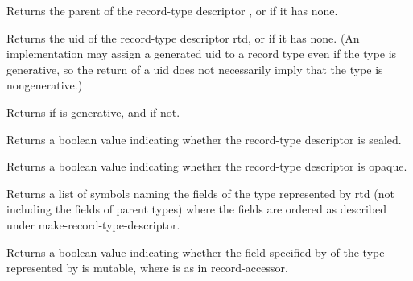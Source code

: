 \begin{entry}{%
}
   
Returns the parent of the record-type descriptor , or
\schfalse{} if it has none.
\end{entry}

\begin{entry}{%
}
   
Returns the uid of the record-type descriptor rtd, or \schfalse{} if it has none.
(An implementation may assign a generated uid to a record type even if the
type is generative, so the return of a uid does not necessarily imply that
the type is nongenerative.)
\end{entry}

\begin{entry}{%
}
   
Returns \schtrue{} if  is generative, and \schfalse{} if not.
\end{entry}

\begin{entry}{%
}

Returns a boolean value indicating whether the record-type descriptor is
sealed.
\end{entry}

\begin{entry}{%
}
   
Returns a boolean value indicating whether the record-type descriptor is
opaque.
\end{entry}

\begin{entry}{%
}
   
Returns a list of symbols naming the fields of the type represented by rtd
(not including the fields of parent types) where the fields are ordered as
described under {\cf make-record-type-descriptor}.
\end{entry}

\begin{entry}{%
}
   
Returns a boolean value indicating whether the field specified by
 of the type represented by  is mutable, where 
is as in {\cf record-accessor}.
\end{entry}

